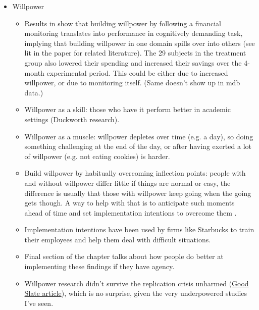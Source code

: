 \documentclass[a4paper, 11pt]{report}
\begin{document}
\begin{itemize}
	\item Willpower
	\begin{itemize}
		\item Results in \citet{oaten2007improvements} show that building willpower by following a financial monitoring translates into performance in cognitively demanding task, implying that building willpower in one domain spills over into others (see lit in the paper for related literature). The 29 subjects in the treatment group also lowered their spending and increased their savings over the 4-month experimental period. This could be either due to increased willpower, or due to monitoring itself. (Same doesn't show up in mdb data.)

		\item Willpower as a skill: those who have it perform better in academic settings (Duckworth research).

		\item Willpower as a muscle: willpower depletes over time (e.g. a day), so doing something challenging at the end of the day, or after having exerted a lot of willpower (e.g. not eating cookies) is harder.

		\item Build willpower by habitually overcoming inflection points: people with and without willpower differ little if things are normal or easy, the difference is usually that those with willpower keep going when the going gets though. A way to help with that is to anticipate such moments ahead of time and set implementation intentions to overcome them \citep{orbell2000motivational}.

		\item Implementation intentions have been used by firms like Starbucks to train their employees and help them deal with difficult situations.

		\item Final section of the chapter talks about how people do better at implementing these findings if they have agency.

		\item Willpower research didn't survive the replication crisis unharmed (\href{http://www.slate.com/articles/health_and_science/cover_story/2016/03/ego_depletion_an_influential_theory_in_psychology_may_have_just_been_debunked.html?via=gdpr-consent}{Good Slate article}), which is no surprise, given the very underpowered studies I've seen.
	\end{itemize}
\end{itemize}
\end{document}
